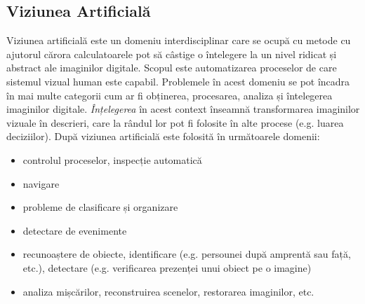 \subsection{Viziunea Artificială}
Viziunea artificială este un domeniu interdisciplinar care se ocupă cu metode cu ajutorul cărora calculatoarele pot să câstige o întelegere la un nivel ridicat și abstract ale imaginilor digitale. Scopul este automatizarea proceselor de care sistemul vizual human este capabil.\newline
Problemele în acest domeniu se pot încadra în mai multe categorii cum ar fi obținerea, procesarea, analiza și întelegerea imaginilor digitale. \textit{Înțelegerea} în acest context înseamnă transformarea imaginilor vizuale în descrieri, care la rândul lor pot fi folosite în alte procese (e.g. luarea deciziilor). După \cite{Szeliski10computervision} viziunea artificială este folosită în următoarele domenii:
\begin{itemize}
	\item controlul proceselor, inspecție automatică
	\item navigare
	\item probleme de clasificare și organizare
	\item detectare de evenimente
	\item recunoaștere de obiecte, identificare (e.g. persounei după amprentă sau față, etc.), detectare (e.g. verificarea prezenței unui obiect pe o imagine)
	\item analiza mișcărilor, reconstruirea scenelor, restorarea imaginilor, etc.
\end{itemize}
